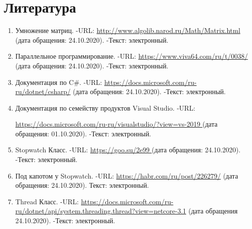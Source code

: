 \documentclass[14pt, a4paper]{extarticle}
\begin{document}
\section*{Литература}
\begin{enumerate}
	\label{literature}
	\item Умножение матриц. -URL: \href{http://www.algolib.narod.ru/Math/Matrix.html}{http://www.algolib.narod.ru/Math/Matrix.html} (дата обращения: 24.10.2020). -Текст: электронный.
	\item Параллельное программирование. -URL: \href{https://www.viva64.com/ru/t/0038/}{https://www.viva64.com/ru/t/0038/} (дата обращения: 24.10.2020). -Текст: электронный.
	\item  Документация по C\#. -URL: \href{https://docs.microsoft.com/ru-ru/dotnet/csharp/}{https://docs.microsoft.com/ru-ru/dotnet/csharp/} (дата обращения: 24.10.2020). -Текст: электронный.
	\item Документация по семейству продуктов Visual Studio. -URL:\par \href{https://docs.microsoft.com/ru-ru/visualstudio/?view=vs-2019}{https://docs.microsoft.com/ru-ru/visualstudio/?view=vs-2019 } (дата обращения: 01.10.2020). -Текст: электронный.
	\item Stopwatch Класс. -URL: \href{https://goo.su/2e99}{https://goo.su/2e99 } (дата обращения: 24.10.2020). -Текст: электронный.
	\item Под капотом у Stopwatch. -URL:  \href{https://habr.com/ru/post/226279/}{https://habr.com/ru/post/226279/} (дата обращения: 24.10.2020). Текст: электронный.
	\item Thread Класс. -URL: \href{https://docs.microsoft.com/ru-ru/dotnet/api/system.threading.thread?view=netcore-3.1}{https://docs.microsoft.com/ru-ru/dotnet/api/system.threading.thread?view=netcore-3.1} (дата обращения 24.10.2020). -Текст: электронный.
\end{enumerate}
\end{document}
